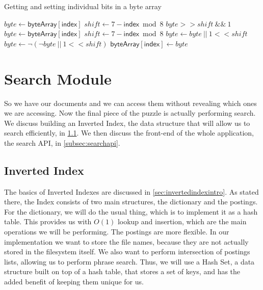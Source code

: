 \documentclass[12pt,a4paper,twoside,openright]{report}
\begin{document}
\begin{algorithm}[H]
\caption{Getting and setting individual bits in a byte array}
\label{alg:bitgetset}
\begin{algorithmic}
\vskip 10pt
  \State $byte \gets \mathsf{byteArray[index]}$
  \State $shift \gets 7 - \mathsf{index} \bmod 8$
  \State \Return $byte >> shift~\&\&~1$
\EndFunction
\vskip 10pt
  \State $byte \gets \mathsf{byteArray[index]}$
  \State $shift \gets 7 - \mathsf{index} \bmod 8$
    \State $byte \gets byte~||~1 << shift$
  \Else
    \State $byte \gets \neg (\neg byte~||~1 << shift)$
  \EndIf
  \State $\mathsf{byteArray[index]} \gets byte$
\EndFunction
\vskip 10pt
\end{algorithmic}
\end{algorithm}

\section{Search Module}
\label{sec:searchmodule}

So we have our documents and we can access them without revealing which ones we are accessing. Now the final piece of the puzzle is actually performing search. We discuss building an Inverted Index, the data structure that will allow us to search efficiently, in \cref{subsec:invertedindex}. We then discuss the front-end of the whole application, the search API, in \cref{subsec:searchapi}.

\subsection{Inverted Index}
\label{subsec:invertedindex}

The basics of Inverted Indexes are discussed in \cref{sec:invertedindexintro}. As stated there, the Index consists of two main structures, the dictionary and the postings. For the dictionary, we will do the usual thing, which is to implement it as a hash table. This provides us with $O(1)$ lookup and insertion, which are the main operations we will be performing. The postings are more flexible. In our implementation we want to store the file names, because they are not actually stored in the filesystem itself. We also want to perform intersection of postings lists, allowing us to perform phrase search. Thus, we will use a Hash Set, a data structure built on top of a hash table, that stores a set of keys, and has the added benefit of keeping them unique for us.
\end{document}
